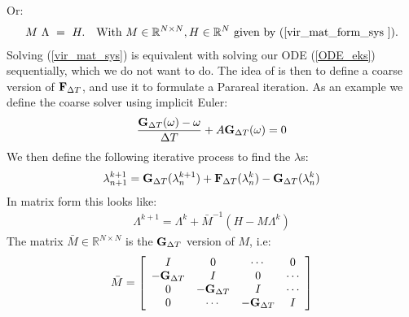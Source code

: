 Or:
\begin{align}
M \ \Lambda \ = \ H.\quad \textrm{With $M\in\mathbb{R}^{N\times N},H\in\mathbb{R}^N$ given by (\ref{vir_mat_form_sys }).} \label{vir_mat_sys}
\end{align}
Solving (\ref{vir_mat_sys}) is equivalent with solving our ODE (\ref{ODE_eks}) sequentially, which we do not want to do. The idea of \cite{maday2002parareal} is then to define a coarse version of $\bold{F}_{\Delta T}$, and use it to formulate a Parareal iteration. As an example we define the coarse solver using implicit Euler:
 \begin{align}
\frac{\bold{G}_{\Delta T}(\omega) -\omega }{\Delta T } + A \bold{G}_{\Delta T}(\omega) = 0
\end{align}  
We then define the following iterative process to find the $\lambda$s:
\begin{align}
\lambda_{n+1}^{k+1} = \bold{G}_{\Delta T}(\lambda_{n}^{k+1}) + \bold{F}_{\Delta T}(\lambda_{n}^{k})-\bold{G}_{\Delta T}(\lambda_{n}^{k})
\end{align} 
In matrix form this looks like:
\begin{align}
\Lambda^{k+1} = \Lambda^k + \bar{M}^{-1}(H-M\Lambda^k) \label{matrix_iter1}
\end{align}
The matrix $\bar{M}\in\mathbb{R}^{N\times N}$ is the $\bold{G}_{\Delta T}$ version of $M$, i.e:
\begin{align}
\bar{M} = \left[ \begin{array}{cccc}
   I & 0 & \cdots & 0 \\  
   -\bold{G}_{\Delta T} & I & 0 & \cdots \\ 
   0 &-\bold{G}_{\Delta T} & I  & \cdots \\
   0 &\cdots &-\bold{G}_{\Delta T} & I   \\
   \end{array}  \right]
\end{align}

